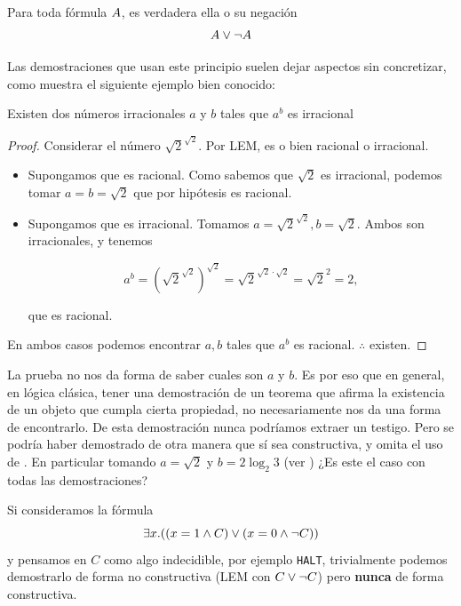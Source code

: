 \begin{prop}[LEM] Para toda fórmula $A$, es verdadera ella o su negación
    \[ A \vee \neg A \]
\end{prop}

Las demostraciones que usan este principio suelen dejar aspectos sin
concretizar, como muestra el siguiente ejemplo bien conocido:

\begin{theorem}\label{fri:thm:irrat}
    Existen dos números irracionales $a$ y $b$ tales que $a^b$ es irracional
\end{theorem}
\begin{proof}
    Considerar el número $\sqrt{2}^{\sqrt{2}}$. Por LEM, es o bien racional o
    irracional.
    \begin{itemize}
        \item Supongamos que es racional. Como sabemos que $\sqrt{2}$ es
              irracional, podemos tomar $a=b=\sqrt{2}$ que por hipótesis es racional.
        \item Supongamos que es irracional. Tomamos $a = \sqrt{2}^{\sqrt{2}}, b
                  = \sqrt{2}$. Ambos son irracionales, y tenemos

              \[
                  a^b
                  = \left( \sqrt{2}^{\sqrt{2}} \right)^{\sqrt{2}}
                  = \sqrt{2}^{\sqrt{2} \cdot \sqrt{2}}
                  = \sqrt{2}^{2}
                  = 2,
              \]

              que es racional.
    \end{itemize}

    En ambos casos podemos encontrar $a, b$ tales que $a^b$ es racional. $\therefore$ existen.
\end{proof}

La prueba no nos da forma de saber cuales son $a$ y $b$. Es por eso que en
general, en lógica clásica, tener una demostración de un teorema que afirma la
existencia de un objeto que cumpla cierta propiedad, no necesariamente nos da
una forma de encontrarlo. De esta demostración nunca podríamos extraer un testigo. Pero se podría haber demostrado de otra manera que sí sea constructiva, y omita el uso de . En particular tomando $a = \sqrt{2}$ y $b = 2 \log_2{3}$ (ver \cite{andrej-constructive}) ¿Es este el caso con todas las demostraciones?

\begin{ejemplo}
    Si consideramos la fórmula
    \[
        \exists x . ((x = 1 \wedge C) \vee (x = 0 \wedge \neg C))
    \]
    y pensamos en $C$ como algo indecidible, por ejemplo \texttt{HALT},
    trivialmente podemos demostrarlo de forma no constructiva (LEM con $C \vee
        \neg C$) pero \textbf{nunca} de forma constructiva.
\end{ejemplo}


